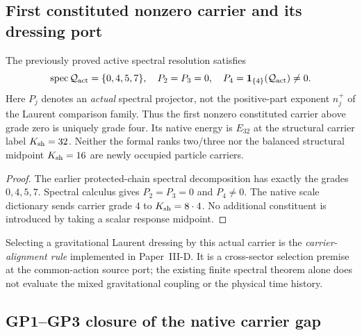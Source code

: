 \documentclass[12pt,a4paper]{article}
\begin{document}
\subsection{First constituted nonzero carrier and its dressing port}
\label{p3c:sec:v2219-first-carrier}
\begin{proposition}
\label{p3c:prop:v2219-first-actual-carrier}
The previously proved active spectral resolution satisfies
\[
 \operatorname{spec}\mathcal Q_{\rm act}=\{0,4,5,7\},\quad
 P_2=P_3=0,\quad P_4=\mathbf1_{\{4\}}(\mathcal Q_{\rm act})\ne0.
\]
Here $P_j$ denotes an \emph{actual} spectral projector, not the
positive-part exponent $n_j^+$ of the Laurent comparison family.  Thus the
first nonzero constituted carrier above grade zero is uniquely grade four.
Its native energy is $E_{32}$ at the structural carrier label $K_{\rm sh}=32$.
Neither the formal ranks two/three nor the balanced structural midpoint
$K_{\rm sh}=16$ are newly occupied particle carriers.
\end{proposition}
\begin{proof}
The earlier protected-chain spectral decomposition has exactly the grades
$0,4,5,7$.  Spectral calculus gives $P_2=P_3=0$ and $P_4\ne0$.
The native scale dictionary sends carrier grade $4$ to $K_{\rm sh}=8\cdot4$.
No additional constituent is introduced by taking a scalar response midpoint.
\end{proof}
\begin{remark}
Selecting a gravitational Laurent dressing by this actual carrier is the
\emph{carrier-alignment rule} implemented in Paper~III-D.  It is a
cross-sector selection premise at the common-action source port; the existing
finite spectral theorem alone does not evaluate the mixed gravitational
coupling or the physical time history.
\end{remark}


\subsection{GP1--GP3 closure of the native carrier gap}
\label{p3c:sec:v165-native-carrier-gap}
\end{document}
